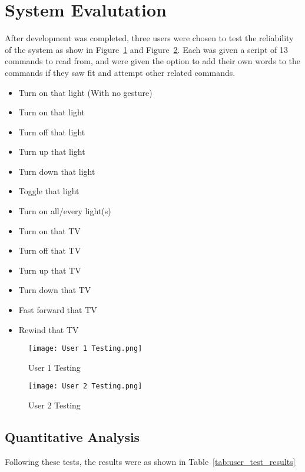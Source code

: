 \section{System Evalutation}
After development was completed, three users were chosen to test the reliability of the system as show in Figure~\ref{fig:user1_testing} and Figure~\ref{fig:user2_testing}.
Each was given a script of 13 commands to read from, and were given the option to add their own words to the commands if they saw fit and attempt other related commands.

\begin{itemize}
    \item Turn on that light (With no gesture)
    \item Turn on that light
    \item Turn off that light
    \item Turn up that light
    \item Turn down that light
    \item Toggle that light
    \item Turn on all/every light(s)
    \item Turn on that TV
    \item Turn off that TV
    \item Turn up that TV
    \item Turn down that TV
    \item Fast forward that TV
    \item Rewind that TV
\end{itemize}

\begin{figure}[!htb]
    \caption{User 1 Testing}
    \centering
    \texttt{[image: User 1 Testing.png]}
    \label{fig:user1_testing}
\end{figure}

\begin{figure}[!htb]
    \caption{User 2 Testing}
    \centering
    \texttt{[image: User 2 Testing.png]}
    \label{fig:user2_testing}
\end{figure}

\subsection{Quantitative Analysis}
Following these tests, the results were as shown in Table~\ref{tab:user_test_results}

